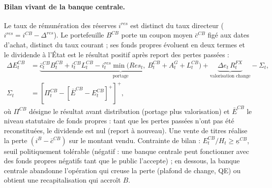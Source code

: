 \documentclass[11pt,a4paper]{article}
\newcommand{\pos}[1]{{\left[#1\right]^{+}}}
\begin{document}
\paragraph{Bilan vivant de la banque centrale.} Le taux de rémunération des réserves $i^{res}$ est distinct du taux directeur ($i^{res}=i^{CB}-\Delta^{res}$). Le portefeuille $B^{CB}$ porte un coupon moyen $\bar c^{CB}$ figé aux dates d'achat, distinct du taux courant ; ses fonds propres évoluent en deux termes et le dividende à l'État est le résultat positif après report des pertes passées :
\begin{equation}
\begin{split}
\Delta E^{CB}_t &= \underbrace{\bar c^{CB}_t B^{CB}_t + i^{CB}_t L^{CB}_t - i^{res}_t \min\!\big(Res_t,\ B^{CB}_t + A^G_t + L^{CB}_t\big)}_{\text{portage}}
 + \underbrace{\Delta e_t\, R^{FX}_t}_{\text{valorisation change}} - \Sigma_t,\\
\Sigma_t &= \pos{\Pi^{CB}_t - \pos{\bar E^{CB} - E^{CB}_t}},
\end{split}
\label{eq:ecb}
\end{equation}
où $\Pi^{CB}$ désigne le résultat avant distribution (portage plus valorisation) et $\bar E^{CB}$ le niveau statutaire de fonds propres : tant que les pertes passées n'ont pas été reconstituées, le dividende est nul (report à nouveau). Une vente de titres réalise la perte $(i^B-\bar c^{CB})$ sur le montant vendu. Contrainte de bilan : $E^{CB}_t/H_t \ge \underline\kappa^{CB}$, seuil politiquement tolérable (négatif : une banque centrale peut fonctionner avec des fonds propres négatifs tant que le public l'accepte) ; en dessous, la banque centrale abandonne l'opération qui creuse la perte (plafond de change, QE) ou obtient une recapitalisation qui accroît $B$.
\end{document}
